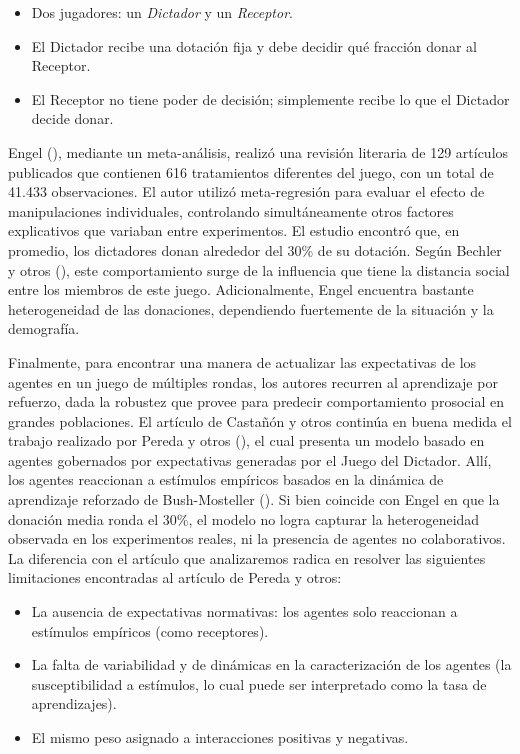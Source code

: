 \documentclass[12pt,a4paper]{article}
\begin{document}
\begin{itemize}
    \item Dos jugadores: un \textit{Dictador} y un \textit{Receptor}.
    \item El Dictador recibe una dotación fija y debe decidir qué fracción donar al Receptor.
    \item El Receptor no tiene poder de decisión; simplemente recibe lo que el Dictador decide donar.
\end{itemize}

Engel (\citeyear{engel2011dictator}), mediante un meta-análisis, realizó una revisión literaria 
de 129 artículos publicados que contienen 616 tratamientos diferentes del juego, con un total
de 41.433 observaciones. El autor utilizó meta-regresión para evaluar el efecto de manipulaciones 
individuales, controlando simultáneamente otros factores explicativos que variaban entre experimentos.
El estudio encontró que, en promedio, los dictadores donan alrededor del 30\% de su dotación.
Según Bechler y otros (\citeyear{BECHLER2015149}), este comportamiento surge de la influencia que 
tiene la distancia social entre los miembros de este juego. Adicionalmente, Engel encuentra bastante
heterogeneidad de las donaciones, dependiendo fuertemente de la situación y la demografía.

Finalmente, para encontrar una manera de actualizar las expectativas de los agentes en un juego de
múltiples rondas, los autores recurren al aprendizaje por refuerzo, dada la robustez que provee para 
predecir comportamiento prosocial en grandes poblaciones. El artículo de Castañón y otros continúa en 
buena medida el trabajo realizado por Pereda y otros (\citeyear{pereda2017emergence}), el cual presenta un modelo 
basado en agentes gobernados por expectativas generadas por el Juego del Dictador. Allí, los agentes reaccionan a 
estímulos empíricos basados en la dinámica de aprendizaje reforzado de  Bush-Mosteller (\citeyear
{bush1951mathematical}). Si bien coincide con Engel en que la donación media ronda el 30\%, el modelo no logra 
capturar la heterogeneidad observada en los experimentos reales, ni la presencia de agentes no colaborativos. La 
diferencia con el artículo que analizaremos radica en resolver las siguientes limitaciones encontradas al artículo 
de Pereda y otros:

\begin{itemize}
\item La ausencia de expectativas normativas: los agentes solo reaccionan a estímulos empíricos (como receptores).
\item La falta de variabilidad y de dinámicas en la caracterización de los agentes (la susceptibilidad
a estímulos, lo cual puede ser interpretado como la tasa de aprendizajes).
\item El mismo peso asignado a interacciones positivas y negativas.
\end{itemize}
\end{document}
